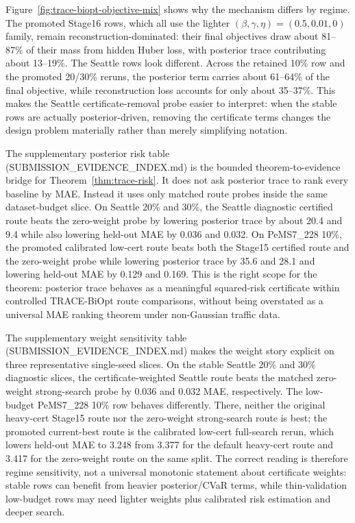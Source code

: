 Figure~\ref{fig:trace-biopt-objective-mix} shows why the mechanism differs by
regime. The promoted Stage16 rows, which all use the lighter
$(\beta,\gamma,\eta)=(0.5,0.01,0)$ family, remain reconstruction-dominated:
their final objectives draw about 81--87\% of their mass from hidden Huber
loss, with posterior trace contributing about 13--19\%. The Seattle rows look
different. Across the retained 10\% row and the promoted 20/30\% reruns, the
posterior term carries about 61--64\% of the final objective, while
reconstruction loss accounts for only about 35--37\%. This makes the Seattle
certificate-removal
probe easier to interpret: when the stable rows are actually posterior-driven,
removing the certificate terms changes the design problem materially rather
than merely simplifying notation.

The supplementary posterior risk table (SUBMISSION\_EVIDENCE\_INDEX.md) is the
bounded theorem-to-evidence bridge for Theorem~\ref{thm:trace-risk}. It does
not ask posterior trace to rank every baseline by MAE. Instead it uses only
matched route probes inside the same dataset-budget slice. On Seattle 20\% and
30\%, the Seattle diagnostic certified route beats the zero-weight probe by
lowering posterior trace by about 20.4 and 9.4 while also lowering held-out
MAE by 0.036 and 0.032. On PeMS7\_228 10\%, the promoted calibrated low-cert
route beats both the Stage15 certified route and the zero-weight probe while
lowering posterior trace by 35.6 and 28.1 and lowering held-out MAE by 0.129
and 0.169. This is the right scope for the theorem: posterior trace behaves as
a meaningful squared-risk certificate within controlled TRACE-BiOpt route
comparisons, without being overstated as a universal MAE ranking theorem under
non-Gaussian traffic data.

The supplementary weight sensitivity table (SUBMISSION\_EVIDENCE\_INDEX.md)
makes the weight story explicit on three representative single-seed slices. On
the stable Seattle 20\% and 30\% diagnostic slices, the certificate-weighted
Seattle route beats the matched zero-weight strong-search probe by 0.036 and
0.032 MAE, respectively. The low-budget PeMS7\_228 10\% row behaves
differently. There, neither the original heavy-cert Stage15 route nor the
zero-weight strong-search route is best; the promoted current-best route is the
calibrated low-cert full-search rerun, which lowers held-out MAE to 3.248 from
3.377 for the default heavy-cert route and 3.417 for the zero-weight route on
the same split. The correct reading is therefore regime sensitivity, not a
universal monotonic statement about certificate weights: stable rows can
benefit from heavier posterior/CVaR terms, while thin-validation low-budget
rows may need lighter weights plus calibrated risk estimation and deeper search.

